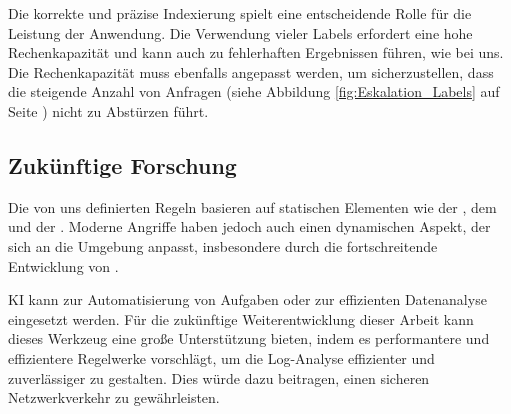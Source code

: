 Die korrekte und präzise Indexierung spielt eine entscheidende Rolle für die Leistung der Anwendung. Die Verwendung vieler Labels erfordert eine hohe Rechenkapazität und kann auch zu fehlerhaften Ergebnissen führen, wie bei uns. Die Rechenkapazität muss ebenfalls angepasst werden, um sicherzustellen, dass die steigende Anzahl von Anfragen (siehe Abbildung \ref{fig:Eskalation_Labels} auf Seite \pageref{fig:Eskalation_Labels}) nicht zu Abstürzen führt.

\subsection{Zukünftige Forschung}

Die von uns definierten Regeln basieren auf statischen Elementen wie der , dem  und der . Moderne Angriffe haben jedoch auch einen dynamischen Aspekt, der sich an die Umgebung anpasst, insbesondere durch die fortschreitende Entwicklung von  \citep{Guembe_AIHACKER}.

\gls{KI} kann zur Automatisierung von Aufgaben oder zur effizienten Datenanalyse eingesetzt werden. Für die zukünftige Weiterentwicklung dieser Arbeit kann dieses Werkzeug eine große Unterstützung bieten, indem es performantere und effizientere Regelwerke vorschlägt, um die Log-Analyse effizienter und zuverlässiger zu gestalten. Dies würde dazu beitragen, einen sicheren Netzwerkverkehr zu gewährleisten.







